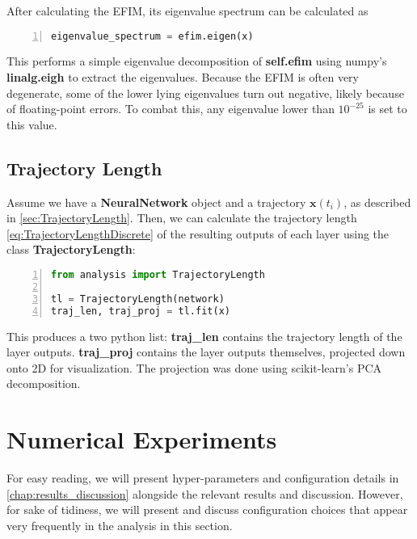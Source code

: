 After calculating the EFIM, its eigenvalue spectrum can be calculated as 

\begin{lstlisting}[language=python, numbers=left]
eigenvalue_spectrum = efim.eigen(x)
\end{lstlisting}
This performs a simple eigenvalue decomposition of \textbf{self.efim} using numpy's \textbf{linalg.eigh} to extract the eigenvalues. Because the EFIM is often very degenerate, some of the lower lying eigenvalues turn out negative, likely because of floating-point errors. To combat this, any eigenvalue lower than $10^{-25}$ is set to this value. 

\subsection{Trajectory Length}\label{sec:TrajectoryLengthImplement}
Assume we have a \textbf{NeuralNetwork} object and a trajectory $\boldsymbol{x}(t_i)$, as described in \autoref{sec:TrajectoryLength}. Then, we can calculate the trajectory length \autoref{eq:TrajectoryLengthDiscrete} of the resulting outputs of each layer using the class \textbf{TrajectoryLength}:

\begin{lstlisting}[language=python, numbers=left]
from analysis import TrajectoryLength

tl = TrajectoryLength(network)
traj_len, traj_proj = tl.fit(x)
\end{lstlisting}
This produces a two python list: \textbf{traj\_len} contains the trajectory length of the layer outputs. \textbf{traj\_proj} contains the layer outputs themselves, projected down onto 2D for visualization. The projection was done using scikit-learn's \cite{scikit-learn} PCA decomposition. 


\section{Numerical Experiments}\label{sec:Numerical Experiments}
For easy reading, we will present hyper-parameters and configuration details in \autoref{chap:results_discussion} alongside the relevant results and discussion. However, for sake of tidiness, we will present and discuss configuration choices that appear very frequently in the analysis in this section.

